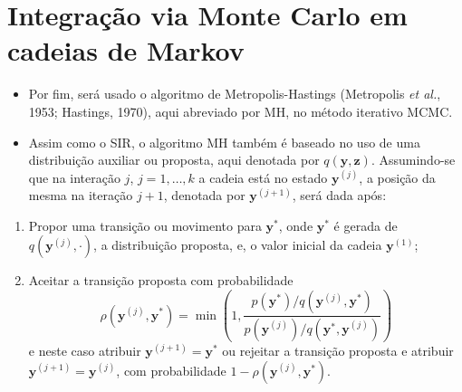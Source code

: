 \documentclass[9pt]{beamer}
\begin{document}
\section{Integração via Monte Carlo em cadeias de Markov}
\begin{frame}
\begin{itemize}
\justifying	
\item Por fim, será usado o algoritmo de Metropolis-Hastings (Metropolis \textit{et al.}, 1953; Hastings, 1970), aqui abreviado por MH, no método iterativo MCMC.
\item Assim como o SIR, o algoritmo MH também é baseado no uso de uma distribuição auxiliar ou proposta, aqui denotada por $q(\bm{y}, \bm{z})$. Assumindo-se que na interação $j$, $j = 1, \ldots, k$ a cadeia está no estado $\bm{y}^{(j)}$, a posição da mesma na iteração $j + 1$, denotada por $\bm{y}^{(j + 1)}$, será dada após:
\end{itemize}
\begin{enumerate}
	\justifying
	\item Propor uma transição ou movimento para $\bm{y}^*$, onde $\bm{y}^*$ é gerada de $q(\bm{y}^{(j)}, \cdot)$, a distribuição proposta, e, o valor inicial da cadeia $\mathbf{y}^{(1)}$;
	\item Aceitar a transição proposta com probabilidade
	\begin{equation}\label{eq:mh_tranprob}
	\rho(\bm{y}^{(j)}, \bm{y}^*) = \min\left(1, \dfrac{p(\bm{y}^*) / q(\bm{y}^{(j)}, \bm{y}^*)}{p(\bm{y}^{(j)}) / q(\bm{y}^*, \bm{y}^{(j)})}\right)
	\end{equation}
	e neste caso atribuir $\bm{y}^{(j + 1)} = \bm{y}^*$ ou rejeitar a transição proposta e atribuir $\bm{y}^{(j + 1)} = \bm{y}^{(j)}$, com probabilidade $1 - \rho(\bm{y}^{(j)}, \bm{y}^*)$.
\end{enumerate}
\end{frame}
\end{document}
